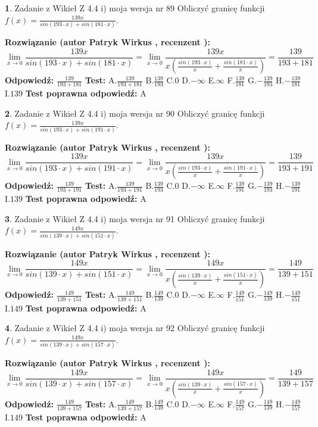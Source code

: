 \documentclass[12pt, a4paper]{article}
\theoremstyle{definition} %
\newtheorem{zad}{}
\newcommand{\zadStart}[1]{\begin{zad}#1\newline}
\newcommand{\zadStop}{\end{zad}}
\newcommand{\rozwStart}[2]{\noindent \textbf{Rozwiązanie (autor #1 , recenzent #2): }\newline}
\newcommand{\rozwStop}{\newline}
\newcommand{\odpStart}{\noindent \textbf{Odpowiedź:}\newline}
\newcommand{\odpStop}{\newline}
\newcommand{\testStart}{\noindent \textbf{Test:}\newline}
\newcommand{\testStop}{\newline}
\newcommand{\kluczStart}{\noindent \textbf{Test poprawna odpowiedź:}\newline}
\newcommand{\kluczStop}{\newline}
\begin{document}
\zadStart{Zadanie z Wikieł Z 4.4 i) moja wersja nr 89}
Obliczyć granicę funkcji $f(x)=\frac{139x}{sin(193\cdot x) +sin(181\cdot x)}$.
\zadStop
\rozwStart{Patryk Wirkus}{}
$$\lim\limits_{x\to 0}\frac{139x}{sin(193\cdot x) +sin(181\cdot x)}=\lim\limits_{x\to 0}\frac{139x}{x(\frac{sin(193\cdot x)}{x}+\frac{sin(181\cdot x)}{x})}=\frac{139}{193+181}$$
\rozwStop
\odpStart
$\frac{139}{193+181}$
\odpStop
\testStart
A.$\frac{139}{193+181}$
B.$\frac{139}{193}$
C.$0$
D.$-\infty$
E.$\infty$
F.$\frac{139}{181}$
G.$-\frac{139}{193}$
H.$-\frac{139}{181}$
I.$139$
\testStop
\kluczStart
A
\kluczStop



\zadStart{Zadanie z Wikieł Z 4.4 i) moja wersja nr 90}
Obliczyć granicę funkcji $f(x)=\frac{139x}{sin(193\cdot x) +sin(191\cdot x)}$.
\zadStop
\rozwStart{Patryk Wirkus}{}
$$\lim\limits_{x\to 0}\frac{139x}{sin(193\cdot x) +sin(191\cdot x)}=\lim\limits_{x\to 0}\frac{139x}{x(\frac{sin(193\cdot x)}{x}+\frac{sin(191\cdot x)}{x})}=\frac{139}{193+191}$$
\rozwStop
\odpStart
$\frac{139}{193+191}$
\odpStop
\testStart
A.$\frac{139}{193+191}$
B.$\frac{139}{193}$
C.$0$
D.$-\infty$
E.$\infty$
F.$\frac{139}{191}$
G.$-\frac{139}{193}$
H.$-\frac{139}{191}$
I.$139$
\testStop
\kluczStart
A
\kluczStop



\zadStart{Zadanie z Wikieł Z 4.4 i) moja wersja nr 91}
Obliczyć granicę funkcji $f(x)=\frac{149x}{sin(139\cdot x) +sin(151\cdot x)}$.
\zadStop
\rozwStart{Patryk Wirkus}{}
$$\lim\limits_{x\to 0}\frac{149x}{sin(139\cdot x) +sin(151\cdot x)}=\lim\limits_{x\to 0}\frac{149x}{x(\frac{sin(139\cdot x)}{x}+\frac{sin(151\cdot x)}{x})}=\frac{149}{139+151}$$
\rozwStop
\odpStart
$\frac{149}{139+151}$
\odpStop
\testStart
A.$\frac{149}{139+151}$
B.$\frac{149}{139}$
C.$0$
D.$-\infty$
E.$\infty$
F.$\frac{149}{151}$
G.$-\frac{149}{139}$
H.$-\frac{149}{151}$
I.$149$
\testStop
\kluczStart
A
\kluczStop



\zadStart{Zadanie z Wikieł Z 4.4 i) moja wersja nr 92}
Obliczyć granicę funkcji $f(x)=\frac{149x}{sin(139\cdot x) +sin(157\cdot x)}$.
\zadStop
\rozwStart{Patryk Wirkus}{}
$$\lim\limits_{x\to 0}\frac{149x}{sin(139\cdot x) +sin(157\cdot x)}=\lim\limits_{x\to 0}\frac{149x}{x(\frac{sin(139\cdot x)}{x}+\frac{sin(157\cdot x)}{x})}=\frac{149}{139+157}$$
\rozwStop
\odpStart
$\frac{149}{139+157}$
\odpStop
\testStart
A.$\frac{149}{139+157}$
B.$\frac{149}{139}$
C.$0$
D.$-\infty$
E.$\infty$
F.$\frac{149}{157}$
G.$-\frac{149}{139}$
H.$-\frac{149}{157}$
I.$149$
\testStop
\kluczStart
A
\kluczStop
\end{document}
